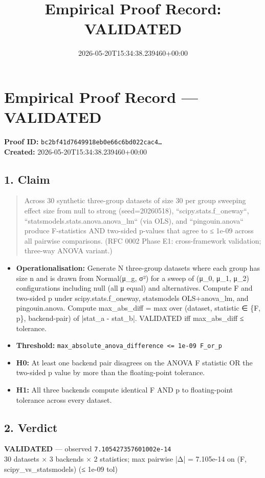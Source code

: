 \documentclass{article}
\title{Empirical Proof Record: VALIDATED}
\date{2026-05-20T15:34:38.239460+00:00}
\begin{document}
\maketitle
\section*{Empirical Proof Record --- \textcolor{validated}{\textbf{VALIDATED}}}
\textbf{Proof ID:} \texttt{bc2bf41d7649918eb0e66c6bd022cac4\dots}\\
\textbf{Created:} 2026-05-20T15:34:38.239460+00:00
\subsection*{1. Claim}
\begin{quote}Across 30 synthetic three-group datasets of size 30 per group sweeping effect size from null to strong (seed=20260518), ``scipy.stats.f\_oneway``, ``statsmodels.stats.anova.anova\_lm`` (via OLS), and ``pingouin.anova`` produce F-statistics AND two-sided p-values that agree to ≤ 1e-09 across all pairwise comparisons. (RFC 0002 Phase E1: cross-framework validation; three-way ANOVA variant.)\end{quote}
\begin{itemize}
\item \textbf{Operationalisation:} Generate N three-group datasets where each group has size n and is drawn from Normal(μ\_g, σ²) for a sweep of (μ\_0, μ\_1, μ\_2) configurations including null (all μ equal) and alternatives. Compute F and two-sided p under scipy.stats.f\_oneway, statsmodels OLS+anova\_lm, and pingouin.anova. Compute max\_abs\_diff = max over (dataset, statistic ∈ \{F, p\}, backend-pair) of |stat\_a - stat\_b|. VALIDATED iff max\_abs\_diff ≤ tolerance.
\item \textbf{Threshold:} \texttt{max\_absolute\_anova\_difference <= 1e-09 F\_or\_p}
\item \textbf{H0:} At least one backend pair disagrees on the ANOVA F statistic OR the two-sided p value by more than the floating-point tolerance.
\item \textbf{H1:} All three backends compute identical F AND p to floating-point tolerance across every dataset.
\end{itemize}
\subsection*{2. Verdict}
\textcolor{validated}{\textbf{VALIDATED}} --- observed \texttt{7.105427357601002e-14}\\
30 datasets × 3 backends × 2 statistics; max pairwise |Δ| = 7.105e-14 on (F, scipy\_vs\_statsmodels) (≤ 1e-09 tol)
\end{document}
